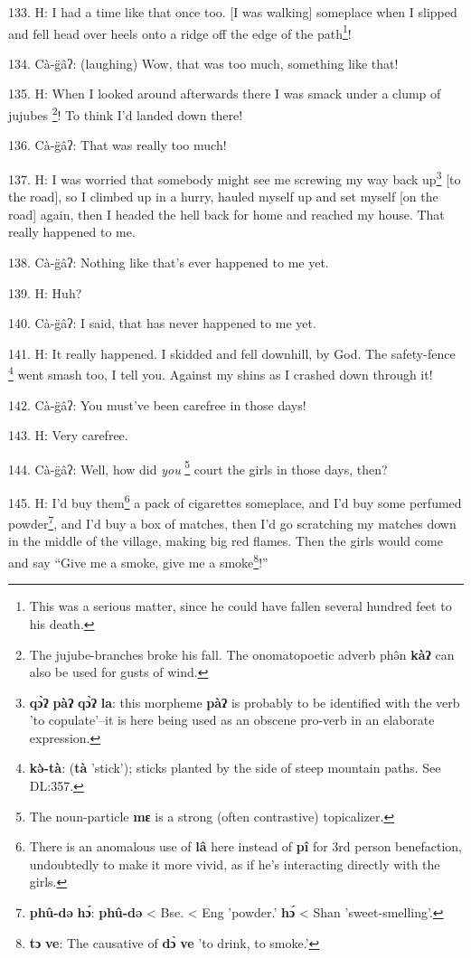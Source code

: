 133. H: I had a time like that once too. [I was walking] someplace when I slipped
and fell head over heels onto a ridge off the edge of the path\footnote{This was a serious matter, since he could have fallen several hundred feet to his death.}!

134. Cà-g̈âʔ: (laughing) Wow, that was too much, something like that!

135. H: When I looked around afterwards there I was smack under a clump of jujubes
\footnote{The jujube-branches broke his fall. The onomatopoetic adverb phə̂n \textbf{kàʔ} can also be used for gusts of wind.}! To think I'd landed down there!

136. Cà-g̈âʔ: That was really too much!

137. H: I was worried that somebody might see me screwing my way back up\footnote{\textbf{qɔ̀ʔ} \textbf{pàʔ} \textbf{qɔ̀ʔ} \textbf{la}: this morpheme \textbf{pàʔ} is probably to be identified with the verb 'to copulate'--it is here being used as an obscene pro-verb in an elaborate expression.} [to
the road], so I climbed up in a hurry, hauled myself up and set myself [on the
road] again, then I headed the hell back for home and reached my house. That really
happened to me.

138. Cà-g̈âʔ: Nothing like that's ever happened to me yet.

139. H: Huh?

140. Cà-g̈âʔ: I said, that has never happened to me yet.

141. H: It really happened. I skidded and fell downhill, by God. The safety-fence
\footnote{\textbf{kə̀-tà}: (\textbf{tà} 'stick'); sticks planted by the side of steep mountain paths. See DL:357.} went smash too, I tell you. Against my shins as I crashed down through it!

142. Cà-g̈âʔ: You must've been carefree in those days!

143. H: Very carefree.

144. Cà-g̈âʔ: Well, how did \textit{you }\footnote{The noun-particle \textbf{mɛ} is a strong (often contrastive) topicalizer.} court the girls in those days,
then?

145. H: I'd buy them\footnote{There is an anomalous use of \textbf{lâ} here instead of \textbf{pî} for 3rd person benefaction, undoubtedly to make it more vivid, as if he's interacting directly with the girls.} a pack of cigarettes someplace, and I'd buy some perfumed
powder\footnote{\textbf{phû-də} \textbf{hɔ́}: \textbf{phû-də} < Bse. < Eng 'powder.' \textbf{hɔ́} < Shan 'sweet-smelling'.}, and I'd buy a box of matches, then I'd go scratching my matches down
in the middle of the village, making big red flames. Then the girls would come
and say ``Give me a smoke, give me a smoke\footnote{\textbf{tɔ} \textbf{ve}: The causative of \textbf{dɔ̀} \textbf{ve} 'to drink, to smoke.'}!''

